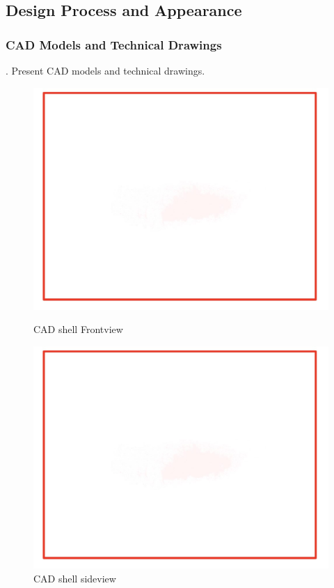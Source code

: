 \subsection{Design Process and Appearance}
\subsubsection{CAD Models and Technical Drawings}
.  Present CAD models and technical drawings.
\begin{figure}[!ht]
  \centering
  \begin{minipage}[b]{0.45\linewidth}
    \includegraphics[width=\linewidth]{texfiles/mech/eimg/aerodynamics/shell_frontview}
    \caption{CAD shell Frontview}
    \label{fig:shell_frontview}
  \end{minipage}
  \hspace{0.5cm}
  \begin{minipage}[b]{0.45\linewidth}
    \includegraphics[width=\linewidth]{texfiles/mech/eimg/aerodynamics/shell_side}
    \caption{CAD shell sideview}
    \label{fig:shell_sideview}
  \end{minipage}
\end{figure}

